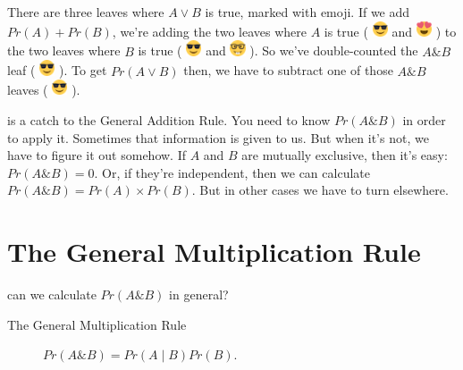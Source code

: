 \documentclass[justified]{tufte-book}
\newcommand{\given}{\mid}
\renewcommand{\wedge}{\mathbin{\&}}
\newcommand{\p}{Pr}
\theoremstyle{definition}
\theoremstyle{definition}
\theoremstyle{definition}
\theoremstyle{remark}
\begin{document}
There are three leaves where \(A \vee B\) is true, marked with emoji. If
we add \(\p(A) + \p(B)\), we're adding the two leaves where \(A\) is
true ( \includegraphics[width=0.18in]{img/emoji_shades_small} and
\includegraphics[width=0.18in]{img/emoji_hearts_small} ) to the two
leaves where \(B\) is true (
\includegraphics[width=0.18in]{img/emoji_shades_small} and
\includegraphics[width=0.18in]{img/emoji_nerd_small} ). So we've
double-counted the \(A \wedge B\) leaf (
\includegraphics[width=0.18in]{img/emoji_shades_small} ). To get
\(\p(A \vee B)\) then, we have to subtract one of those \(A \wedge B\)
leaves ( \includegraphics[width=0.18in]{img/emoji_shades_small} ).

 is a catch to the General Addition Rule. You need to
know \(\p(A \wedge B)\) in order to apply it. Sometimes that information
is given to us. But when it's not, we have to figure it out somehow. If
\(A\) and \(B\) are mutually exclusive, then it's easy:
\(\p(A \wedge B) = 0\). Or, if they're independent, then we can
calculate \(\p(A \wedge B) = \p(A) \times \p(B)\). But in other cases we
have to turn elsewhere.

\hypertarget{the-general-multiplication-rule}{%
\section{The General Multiplication
Rule}\label{the-general-multiplication-rule}}

 can we calculate \(\p(A \wedge B)\) in general?

\begin{description}
\item[The General Multiplication Rule]
\(\p(A \wedge B) = \p(A \given B) \p(B).\)
\end{description}
\end{document}
